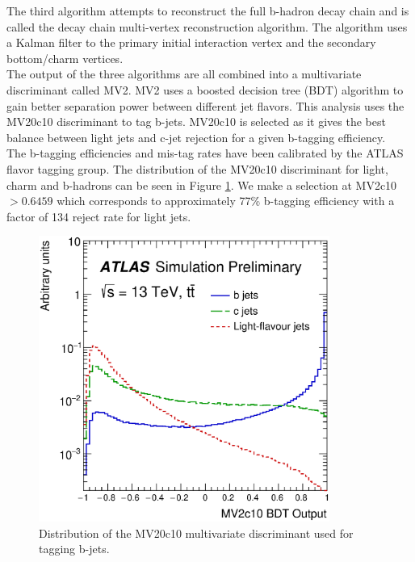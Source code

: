 \indent The third algorithm attempts to reconstruct the full b-hadron decay chain and is called the decay chain multi-vertex reconstruction algorithm.  The algorithm uses a Kalman filter to the primary initial interaction vertex and the secondary bottom/charm vertices.  \\

\indent The output of the three algorithms are all combined into a multivariate discriminant called MV2.  MV2 uses a boosted decision tree (BDT) algorithm \cite{TMVA} to gain better separation power between different jet flavors. This analysis uses the MV20c10 discriminant to tag b-jets. MV20c10 is selected as it gives the best balance between light jets and c-jet rejection for a given b-tagging efficiency.  \\

\indent The b-tagging efficiencies and mis-tag rates have been calibrated by the ATLAS flavor tagging group.  The distribution of the MV20c10 discriminant for light, charm and b-hadrons can be seen in Figure \ref{fig:MV20c10}. We make a selection at MV2c10 $ > 0.6459$ which corresponds to approximately 77\% b-tagging efficiency with a factor of 134 reject rate for light jets.  \\

\begin{figure}[h!]
  \begin{center}
    \includegraphics[width=0.85\textwidth]{figures/JetCalib/MV20c10.eps}\hspace{0.05\textwidth}
\end{center}
\caption[Distribution of the MV20c10 multivariate discriminant used for tagging b-jets]{Distribution of the MV20c10 multivariate discriminant used for tagging b-jets.\cite{btagging2016}  }
\label{fig:MV20c10} 
\end{figure}
